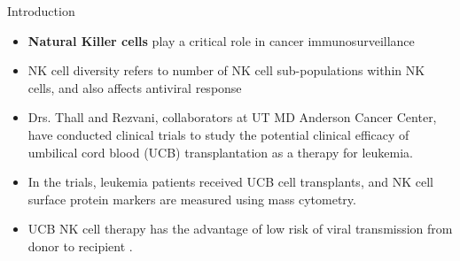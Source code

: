 \documentclass[ignorenonframetext,]{beamer}
\begin{document}
\begin{frame}{Introduction}
  \begin{itemize}
    \setlength\itemsep{1em}
    \item
      \textbf{Natural Killer cells} play a critical role in cancer immunosurveillance
    \item NK cell diversity refers to number of NK cell sub-populations within
      NK cells, and also affects antiviral response
    \item Drs. Thall and Rezvani, collaborators at UT MD Anderson Cancer
      Center, have conducted clinical trials to study the potential clinical
      efficacy of umbilical cord blood (UCB) transplantation as a therapy for
      leukemia.
    \item In the trials, leukemia patients received UCB cell transplants, and
      NK cell surface protein markers are measured using mass cytometry.
    \item UCB NK cell therapy has the advantage of low risk of viral
      transmission from donor to recipient \citep{sarvaria2017umbilical}.
  \end{itemize}
\end{frame}
\end{document}
